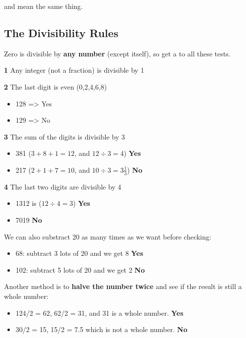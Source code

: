  and  mean the same thing.

\subsection{The Divisibility Rules}

Zero is divisible by \textbf{any number} (except itself), so get a  to all these tests.

\textbf{1} Any integer (not a fraction) is divisible by 1

\textbf{2} The last digit is even (0,2,4,6,8)

\begin{itemize}
  \item 128 => Yes
  \item 129 => No
\end{itemize}

\textbf{3} The sum of the digits is divisible by 3

\begin{itemize}
  \item 381 ($3+8+1=12$, and $12 \div 3 = 4$) \textbf{Yes}
  \item 217 ($2+1+7=10$, and $10 \div 3 = 3\frac{1}{3}$) \textbf{No}
\end{itemize}

\vspace{10 mm}

\textbf{4} The last two digits are divisible by 4

\begin{itemize}
  \item 1312 is ($12 \div 4 = 3$) \textbf{Yes}
  \item 7019 \textbf{No}
\end{itemize}

We can also substract 20 as many times as we want before checking:

\begin{itemize}
  \item 68: subtract 3 lots of 20 and we get 8 \textbf{Yes}
  \item 102: subtract 5 lots of 20 and we get 2 \textbf{No}
\end{itemize}

Another method is to \textbf{halve the number twice} and see if the result is still a whole number:

\begin{itemize}
  \item 124/2 = 62, 62/2 = 31, and 31 is a whole number. \textbf{Yes}
  \item 30/2 = 15, 15/2 = 7.5 which is not a whole number. \textbf{No}
\end{itemize}

